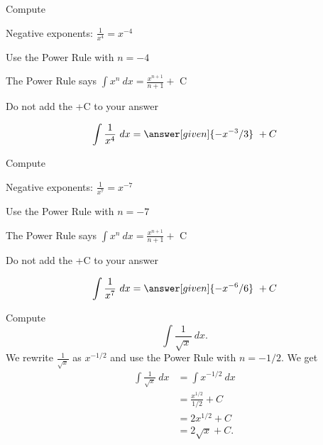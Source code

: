 \documentclass{ximera}
\begin{document}
\begin{problem} %
Compute 

\begin{hint}
Negative exponents: $\frac{1}{x^4} = x^{-4}$
\end{hint}
\begin{hint}
Use the Power Rule with $n=-4$
\end{hint}
\begin{hint}
The Power Rule says $\int x^n \ dx = \frac{x^{n+1}}{n+1} +$ C
\end{hint}
\begin{hint}
\begin{center}
Do not add the +C to your answer
\end{center}
\end{hint}

\[
\int \frac{1}{x^4} \ dx =
\answer[given]{-x^{-3} /3} \ + C
\]
\end{problem}


\begin{problem} %
Compute 

\begin{hint}
Negative exponents: $\frac{1}{x^7} = x^{-7}$
\end{hint}
\begin{hint}
Use the Power Rule with $n=-7$
\end{hint}
\begin{hint}
The Power Rule says $\int x^n \ dx = \frac{x^{n+1}}{n+1} +$ C
\end{hint}
\begin{hint}
\begin{center}
Do not add the +C to your answer
\end{center}
\end{hint}

\[
\int \frac{1}{x^7} \ dx =
\answer[given]{-x^{-6} /6} \ + C
\]
\end{problem}



\begin{example} %
Compute $$\int \frac{1}{\sqrt x} \ dx.$$
We rewrite $\frac{1}{\sqrt x}$ as $x^{-1/2}$ and use the Power Rule 
with $n= -1/2$.
We get
\begin{align*}
\int \frac{1}{\sqrt x} \ dx &= \int x^{-1/2} \ dx \\
&= \frac{x^{1/2}}{1/2} + C \\ 
&=  2x^{1/2} + C \\
&= 2\sqrt x +C.
\end{align*} 

\end{example}
\end{document}
